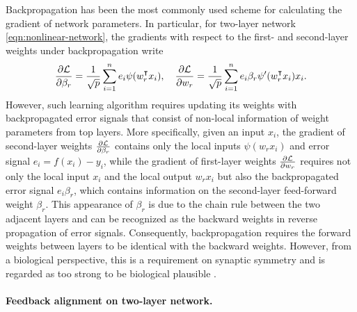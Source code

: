 Backpropagation has been the most commonly used scheme for calculating the gradient of network parameters. In particular, for two-layer network \eqref{eqn:nonlinear-network}, the gradients with respect to the first- and second-layer weights under backpropagation write
\begin{equation*}
    \frac{\partial\Loss}{\partial \beta_r} = \frac{1}{\sqrt p}\sum_{i=1}^n e_i\psi(w_r\transpose x_i), \quad
    \frac{\partial\Loss}{\partial w_r} = \frac{1}{\sqrt p} \sum_{i=1}^n e_i \beta_r\psi'(w_r\transpose x_i)x_i.
\end{equation*}
However, such learning algorithm requires updating its weights with backpropagated error signals that consist of non-local information of weight parameters from top layers. More specifically, given an input $x_i$, the gradient of second-layer weights $\frac{\partial \mathcal{L}}{\partial \beta_r}$ contains only the local inputs $\psi(w_r x_i)$ and error signal $e_i = f(x_i) - y_i$, while the gradient of first-layer weights $\frac{\partial \mathcal{L}}{\partial w_r}$ requires not only the local input $x_i$ and the local output $w_r x_i$ but also the backpropagated error signal $e_i\beta_r$, which contains information on the second-layer feed-forward weight $\beta_r$. This appearance of $\beta_r$ is due to the chain rule between the two adjacent layers and can be recognized as the backward weights in reverse propagation of error signals.
Consequently, backpropagation requires the forward weights between layers to be identical with the backward weights. However, from a biological perspective, this is a requirement on synaptic symmetry and is regarded as too strong to be biological plausible \citep{lillicrap2016random}. 

\paragraph{Feedback alignment on two-layer network.}

